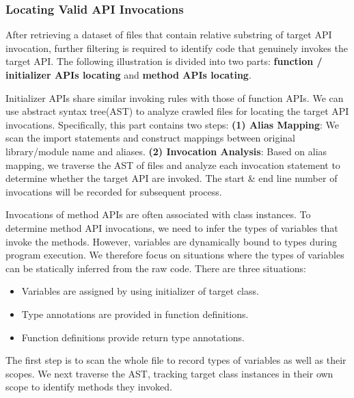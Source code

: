 \subsubsection{Locating Valid API Invocations}
\label{appx_api_invocation_filtering}

After retrieving a dataset of files that contain relative substring of target API invocation, further filtering is required to identify code that genuinely invokes the target API. 
The following illustration is divided into two parts: \textbf{function / initializer APIs locating} and \textbf{method APIs locating}.

Initializer APIs share similar invoking rules with those of function APIs. 
We can use abstract syntax tree(AST) to analyze crawled files for locating the target API invocations.
Specifically, this part contains two steps:
\textbf{(1) Alias Mapping}: 
We scan the import statements and construct mappings between original library/module name and aliases.
\textbf{(2) Invocation Analysis}:
Based on alias mapping, we traverse the AST of files and analyze each invocation statement to determine whether the target API are invoked. 
The start \& end line number of invocations will be recorded for subsequent process.

Invocations of method APIs are often associated with class instances. 
To determine method API invocations, we need to infer the types of variables that invoke the methods. 
However, variables are dynamically bound to types during program execution. We therefore focus on situations where the types of variables can be statically inferred from the raw code. 
There are three situations:
\begin{itemize}
    \item Variables are assigned by using initializer of target class.
    \vspace{-0.6em}
    \item Type annotations are provided in function definitions.
    \vspace{-0.6em}
    \item Function definitions provide return type annotations.
\end{itemize}
The first step is to scan the whole file to record types of variables as well as their scopes. We next traverse the AST, tracking target class instances in their own scope to identify methods they invoked. 


